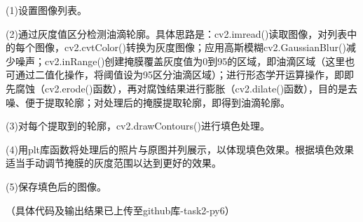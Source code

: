 \documentclass[a4paper, 12pt]{article}
\begin{document}
	(1)设置图像列表。
	
	(2)通过灰度值区分检测油滴轮廓。具体思路是：cv2.imread()读取图像，对列表中的每个图像，cv2.cvtColor()转换为灰度图像；应用高斯模糊cv2.GaussianBlur()减少噪声；cv2.inRange()创建掩膜覆盖灰度值为0到95的区域，即油滴区域（这里也可通过二值化操作，将阈值设为95区分油滴区域）；进行形态学开运算操作，即即先腐蚀（cv2.erode()函数），再对腐蚀结果进行膨胀（cv2.dilate()函数），目的是去噪、便于提取轮廓；对处理后的掩膜提取轮廓，即得到油滴轮廓。

	(3)对每个提取到的轮廓，cv2.drawContours()进行填色处理。
	
	(4)用plt库函数将处理后的照片与原图并列展示，以体现填色效果。根据填色效果适当手动调节掩膜的灰度范围以达到更好的效果。
	
	(5)保存填色后的图像。
	
	（具体代码及输出结果已上传至github库-task2-py6）
	
\end{document}
